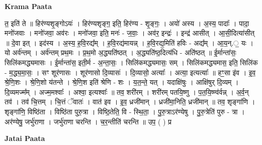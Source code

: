 \documentclass[17pt]{extarticle}
\begin{document}
\textbf{Krama Paata} \newline

त॒ इति॑ ते ॥ हिर॑ण्यशृ॒ङ्गोऽयः॑ । हिर॑ण्यशृङ्ग॒ इति॒ हिर॑ण्य - शृ॒ङ्गः॒ । अयो॑ अस्य । अ॒स्य॒ पादाः᳚ । पादा॒ मनो॑जवाः । मनो॑जवा॒ अव॑रः । मनो॑जवा॒ इति॒ मनः॑ - ज॒वाः॒ । अव॑र॒ इन्द्रः॑ । इन्द्र॑ आसीत् । आ॒सी॒दित्या॑सीत् ॥ दे॒वा इत् । इद॑स्य । अ॒स्य॒ ह॒वि॒रद्य᳚म् । ह॒वि॒रद्य॑मायन्न् । ह॒वि॒रद्य॒मिति॑ हविः - अद्य᳚म् । आ॒य॒न्.॒ यः । यो अर्व॑न्तम् । अर्व॑न्तम् प्रथ॒मः । प्र॒थ॒मो अ॒द्ध्यति॑ष्ठत् । अ॒द्ध्यति॑ष्ठ॒दित्य॑धि - अति॑ष्ठत् ॥ ई॒र्मान्ता॑सः॒ सिलि॑कमद्ध्यमासः । ई॒र्मान्ता॑स॒ इती॒र्म - अ॒न्ता॒सः॒ । सिलि॑कमद्ध्यमासः॒ सम् । सिलि॑कमद्ध्यमास॒ इति॒ सिलि॑क - म॒द्ध्य॒मा॒सः॒ । सꣳ शूर॑णासः । शूर॑णासो दि॒व्यासः॑ । दि॒व्यासो॒ अत्याः᳚ । अत्या॒ इत्यत्याः᳚ ॥ हꣳ॒॒सा इ॑व । इ॒व॒ श्रे॒णि॒शः । श्रे॒णि॒शो य॑तन्ते । श्रे॒णि॒श इति॑ श्रेणि - शः । य॒त॒न्ते॒ यत् । यदाक्षि॑षुः । आक्षि॑षुर् दि॒व्यम् । दि॒व्यमज्म᳚म् । अज्म॒मश्वाः᳚ । अश्वा॒ इत्यश्वाः᳚ ॥ तव॒ शरी॑रम् । शरी॑रम् पतयि॒ष्णु । प॒त॒यि॒ष्ण्व॑र्वन्न् । अ॒र्व॒न् तव॑ । तव॑ चि॒त्तम् । चि॒त्तं ॅवातः॑ । वात॑ इव । इ॒व॒ ध्रजी॑मान् । ध्रजी॑मा॒निति॒ ध्रजी॑मान् ॥ तव॒ शृङ्गा॑णि । शृङ्गा॑णि॒ विष्ठि॑ता । विष्ठि॑ता पुरु॒त्रा । विष्ठि॒तेति॒ वि - स्थि॒ता॒ । पु॒रु॒त्राऽर॑ण्येषु । पु॒रु॒त्रेति॑ पुरु - त्रा । अर॑ण्येषु॒ जर्भु॑राणा । जर्भु॑राणा चरन्ति । च॒र॒न्तीति॑ चरन्ति ॥ उप॒ ( ) प्र \newline

\textbf{Jatai Paata} \newline
\end{document}

